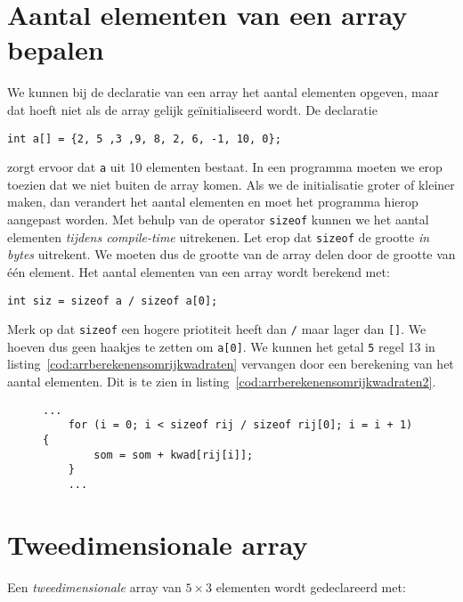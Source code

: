 \section{Aantal elementen van een array bepalen}
We kunnen bij de declaratie van een array het aantal elementen opgeven, maar dat hoeft niet als de array gelijk geïnitialiseerd wordt. De declaratie

\hspace*{1em}\texttt{int a[] = \{2, 5 ,3 ,9, 8, 2, 6, -1, 10, 0\};}

zorgt ervoor dat \texttt{a} uit 10 elementen bestaat. In een programma moeten we erop toezien dat we niet buiten de array komen. Als we de initialisatie groter of kleiner maken, dan verandert het aantal elementen en moet het programma hierop aangepast worden. Met behulp van de operator \texttt{sizeof} kunnen we het aantal elementen \textsl{tijdens compile-time} uitrekenen. Let erop dat \texttt{sizeof} de grootte \textsl{in bytes} uitrekent. We moeten dus de grootte van de array delen door de grootte van één element. Het aantal elementen van een array wordt berekend met:

\hspace*{1em}\texttt{int siz = sizeof a / sizeof a[0];}

Merk op dat \texttt{sizeof} een hogere priotiteit heeft dan \texttt{/} maar lager dan \texttt{[]}. We hoeven dus geen haakjes te zetten om \texttt{a[0]}. We kunnen het getal \texttt{5} regel 13 in listing~\ref{cod:arrberekenensomrijkwadraten} vervangen door een berekening van het aantal elementen. Dit is te zien in listing~\ref{cod:arrberekenensomrijkwadraten2}.

\begin{figure}[!ht]
\begin{lstlisting}[caption=Bepalen van het aantal elementen in een array.,label=cod:arrberekenensomrijkwadraten2]
    ...
    for (i = 0; i < sizeof rij / sizeof rij[0]; i = i + 1) {
        som = som + kwad[rij[i]];
    }
    ...
\end{lstlisting}
\end{figure}



\section{Tweedimensionale array}
Een \textsl{tweedimensionale} array van $5\times3$ elementen wordt gedeclareerd met:

